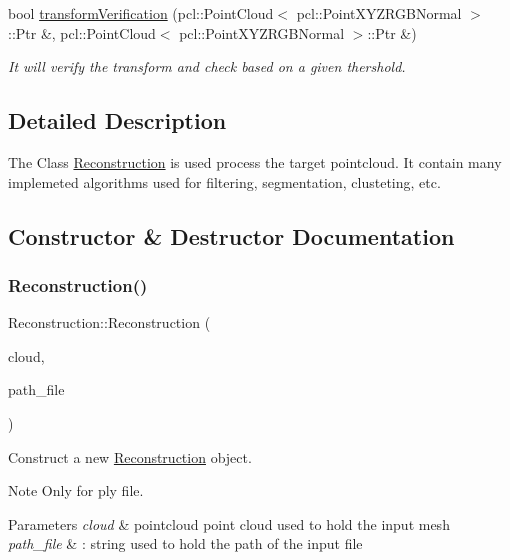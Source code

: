 \begin{DoxyCompactItemize}
bool \hyperlink{classReconstruction_a73c384d0419386505e5fe58a55b556c9}{transform\+Verification} (pcl\+::\+Point\+Cloud$<$ pcl\+::\+Point\+X\+Y\+Z\+R\+G\+B\+Normal $>$\+::Ptr \&, pcl\+::\+Point\+Cloud$<$ pcl\+::\+Point\+X\+Y\+Z\+R\+G\+B\+Normal $>$\+::Ptr \&)
\begin{DoxyCompactList}\small\item\em It will verify the transform and check based on a given thershold. \end{DoxyCompactList}\end{DoxyCompactItemize}


\subsection{Detailed Description}
The Class \hyperlink{classReconstruction}{Reconstruction} is used process the target pointcloud. It contain many implemeted algorithms used for filtering, segmentation, clusteting, etc. 

\subsection{Constructor \& Destructor Documentation}
\mbox{\label{classReconstruction_ac7ac62559b5825dcec2a760946897f40}} 
\subsubsection{\texorpdfstring{Reconstruction()}{Reconstruction()}}
{\footnotesize\ttfamily Reconstruction\+::\+Reconstruction (\begin{DoxyParamCaption}\item[{pcl\+::\+Point\+Cloud$<$ pcl\+::\+Point\+X\+Y\+Z\+R\+G\+B\+Normal $>$\+::Ptr \&}]{cloud,  }\item[{std\+::string}]{path\+\_\+file }\end{DoxyParamCaption})}



Construct a new \hyperlink{classReconstruction}{Reconstruction} object. 

\begin{DoxyNote}{Note}
Only for ply file. 
\end{DoxyNote}

\begin{DoxyParams}{Parameters}
{\em cloud} & pointcloud point cloud used to hold the input mesh \\
\hline
{\em path\+\_\+file} & \+: string used to hold the path of the input file \\
\hline
\end{DoxyParams}


